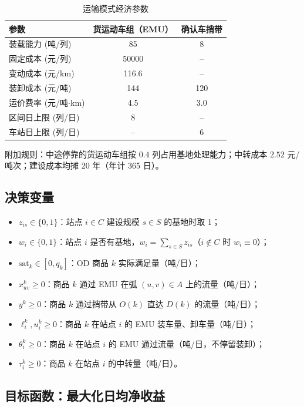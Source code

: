 \documentclass[12pt,a4paper,fontset=none]{ctexart}
\begin{document}
\begin{table}[H]
\centering\small
\caption{运输模式经济参数}
\label{tab:econ}
\begin{tabular}{lcc}
\toprule
参数 & 货运动车组（EMU） & 确认车捎带 \\
\midrule
装载能力 (吨/列)       & 85    & 8     \\
固定成本 (元/列)       & 50000 & --    \\
变动成本 (元/km)       & 116.6 & --    \\
装卸成本 (元/吨)       & 144   & 120   \\
运价费率 (元/吨$\cdot$km) & 4.5 & 3.0   \\
区间日上限 (列/日)     & 8     & --    \\
车站日上限 (列/日)     & --    & 6     \\
\bottomrule
\end{tabular}
\end{table}

附加规则：中途停靠的货运动车组按 $0.4$ 列占用基地处理能力；中转成本 $2.52$ 元/吨次；建设成本均摊 20 年（年计 365 日）。

\subsection{决策变量}

\begin{itemize}[leftmargin=*]
    \item $z_{is} \in \{0,1\}$：站点 $i\in C$ 建设规模 $s\in S$ 的基地时取 1；
    \item $w_i \in \{0,1\}$：站点 $i$ 是否有基地，$w_i = \sum_{s\in S} z_{is}$（$i\notin C$ 时 $w_i\equiv 0$）；
    \item $\text{sat}_k \in [0, q_k]$：OD 商品 $k$ 实际满足量（吨/日）；
    \item $x_{uv}^k \ge 0$：商品 $k$ 通过 EMU 在弧 $(u,v)\in A$ 上的流量（吨/日）；
    \item $y^k \ge 0$：商品 $k$ 通过捎带从 $O(k)$ 直达 $D(k)$ 的流量（吨/日）；
    \item $\ell_i^k, u_i^k \ge 0$：商品 $k$ 在站点 $i$ 的 EMU 装车量、卸车量（吨/日）；
    \item $\theta_i^k \ge 0$：商品 $k$ 在站点 $i$ 的 EMU 通过流量（吨/日，不停留装卸）；
    \item $\tau_i^k \ge 0$：商品 $k$ 在站点 $i$ 的中转量（吨/日）。
\end{itemize}

\subsection{目标函数：最大化日均净收益}
\end{document}

